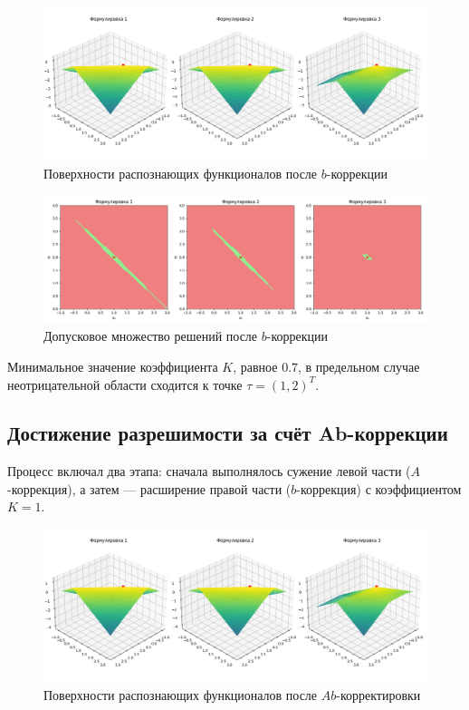 \documentclass{article}
\begin{document}
\begin{figure}[H]
  \centering
  \includegraphics[width=\textwidth]{tol_b_corrected}
  \caption{Поверхности распознающих функционалов после \( b \)-коррекции}
  \label{figure:tol_b_corrected}
\end{figure}

\begin{figure}[H]
  \centering
  \includegraphics[width=\textwidth]{tol_functional_b_corrected}
  \caption{Допусковое множество решений после \( b \)-коррекции}
  \label{figure:tol_functional_b_corrected}
\end{figure}

Минимальное значение коэффициента \( K \), равное \( 0.7 \), в предельном случае неотрицательной области сходится к точке \( \tau = (1, 2)^T \).



\subsection{Достижение разрешимости за счёт Ab-коррекции}

Процесс включал два этапа: сначала выполнялось сужение левой части (\( A \)-коррекция), а затем — расширение правой части (\( b \)-коррекция) с коэффициентом \( K = 1 \).

\begin{figure}[H]
    \begin{center}
        \includegraphics[width = \textwidth]{tol_ab_corrected}
        \caption{Поверхности распознающих функционалов после
    \( Ab \)-корректировки}
  \label{figure:tol_ab_corrected}
    \end{center}
\end{figure}
\end{document}
